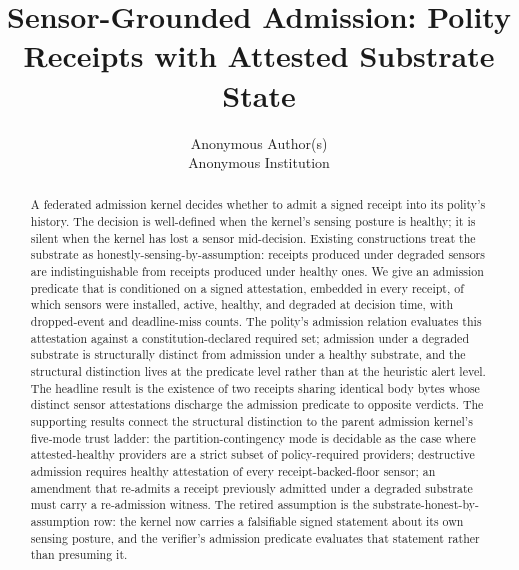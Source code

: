 \documentclass[11pt]{article}
\title{Sensor-Grounded Admission: Polity Receipts with Attested Substrate State}
\author{Anonymous Author(s)\\Anonymous Institution}
\date{}
\begin{document}
\maketitle

\begin{abstract}
A federated admission kernel decides whether to admit a signed receipt into its polity's history. The decision is well-defined when the kernel's sensing posture is healthy; it is silent when the kernel has lost a sensor mid-decision. Existing constructions treat the substrate as honestly-sensing-by-assumption: receipts produced under degraded sensors are indistinguishable from receipts produced under healthy ones. We give an admission predicate that is conditioned on a signed attestation, embedded in every receipt, of which sensors were installed, active, healthy, and degraded at decision time, with dropped-event and deadline-miss counts. The polity's admission relation evaluates this attestation against a constitution-declared required set; admission under a degraded substrate is structurally distinct from admission under a healthy substrate, and the structural distinction lives at the predicate level rather than at the heuristic alert level. The headline result is the existence of two receipts sharing identical body bytes whose distinct sensor attestations discharge the admission predicate to opposite verdicts. The supporting results connect the structural distinction to the parent admission kernel's five-mode trust ladder: the partition-contingency mode is decidable as the case where attested-healthy providers are a strict subset of policy-required providers; destructive admission requires healthy attestation of every receipt-backed-floor sensor; an amendment that re-admits a receipt previously admitted under a degraded substrate must carry a re-admission witness. The retired assumption is the substrate-honest-by-assumption row: the kernel now carries a falsifiable signed statement about its own sensing posture, and the verifier's admission predicate evaluates that statement rather than presuming it.
\end{abstract}















\appendix


\end{document}
